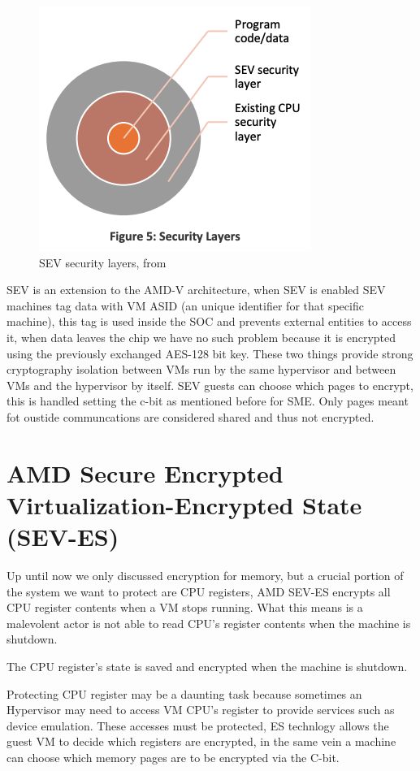 \documentclass[twocolumn]{article}
\begin{document}
\begin{figure}
    \centering
    \includegraphics[scale=0.25]{img/security-layers.png}
    \caption{SEV security layers, from \cite{memory-encryption}}
\end{figure}

SEV is an extension to the AMD-V architecture, when SEV is enabled SEV machines tag data with VM ASID (an unique identifier for that specific machine), this tag is used inside the SOC and prevents external entities to access it, when data leaves the chip we have no such problem because it is encrypted using the previously exchanged AES-128 bit key. These two things provide strong cryptography isolation between VMs run by the same hypervisor and between VMs and the hypervisor by itself. SEV guests can choose which pages to encrypt, this is handled setting the c-bit as mentioned before for SME. Only pages meant fot oustide communcations are considered shared and thus not encrypted.

\section{AMD Secure Encrypted Virtualization-Encrypted State (SEV-ES)}

Up until now we only discussed encryption for memory, but a crucial portion of the system we want to protect are CPU registers, AMD SEV-ES encrypts all CPU register contents when a VM stops running. What this means is a malevolent actor is not able to read CPU's register contents when the machine is shutdown.

The CPU register's state is saved and encrypted when the machine is shutdown.

Protecting CPU register may be a daunting task because sometimes an Hypervisor may need to access VM CPU's register to provide services such as device emulation. These accesses must be protected, ES technlogy allows the guest VM to decide which registers are encrypted, in the same vein a machine can choose which memory pages are to be encrypted via the C-bit.
\end{document}
